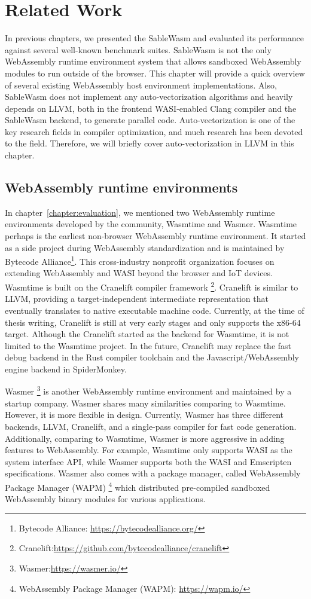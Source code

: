 \chapter{Related Work}

In previous chapters, we presented the SableWasm and evaluated its performance
against several well-known benchmark suites. SableWasm is not the only
WebAssembly runtime environment system that allows sandboxed WebAssembly
modules to run outside of the browser. This chapter will provide a quick
overview of several existing WebAssembly host environment implementations. Also,
SableWasm does not implement any auto-vectorization algorithms and heavily
depends on LLVM, both in the frontend WASI-enabled Clang compiler and the
SableWasm backend, to generate parallel code. Auto-vectorization is one of the
key research fields in compiler optimization, and much research has been
devoted to the field. Therefore, we will briefly cover auto-vectorization
in LLVM in this chapter.

\section*{WebAssembly runtime environments}

In chapter~\ref{chapter:evaluation}, we mentioned two WebAssembly runtime
environments developed by the community, Wasmtime and Wasmer. Wasmtime perhaps
is the earliest non-browser WebAssembly runtime environment. It started as a
side project during WebAssembly standardization and is maintained by Bytecode
Alliance\footnote{Bytecode Alliance: \url{https://bytecodealliance.org/}}. This
cross-industry nonprofit organization focuses on extending WebAssembly and WASI
beyond the browser and IoT devices. Wasmtime is built on the Cranelift compiler
framework
\footnote{Cranelift:\url{https://github.com/bytecodealliance/cranelift}}.
Cranelift is similar to LLVM, providing a target-independent intermediate
representation that eventually translates to native executable machine code.
Currently, at the time of thesis writing, Cranelift is still at very early
stages and only supports the x86-64 target. Although the Cranelift started as
the backend for Wasmtime, it is not limited to the Wasmtime project. In the
future, Cranelift may replace the fast debug backend in the Rust compiler
toolchain and the Javascript/WebAssembly engine backend in SpiderMonkey.

Wasmer \footnote{Wasmer:\url{https://wasmer.io/}} is another WebAssembly
runtime environment and maintained by a startup company. Wasmer shares many
similarities comparing to Wasmtime. However, it is more flexible in design.
Currently, Wasmer has three different backends, LLVM, Cranelift, and a
single-pass compiler for fast code generation. Additionally, comparing to
Wasmtime, Wasmer is more aggressive in adding features to WebAssembly. For
example, Wasmtime only supports WASI as the system interface API, while Wasmer
supports both the WASI and Emscripten specifications. Wasmer also comes with a
package manager, called WebAssembly Package Manager (WAPM)
\footnote{WebAssembly Package Manager (WAPM): \url{https://wapm.io/}} which
distributed pre-compiled sandboxed WebAssembly binary modules for various
applications.

